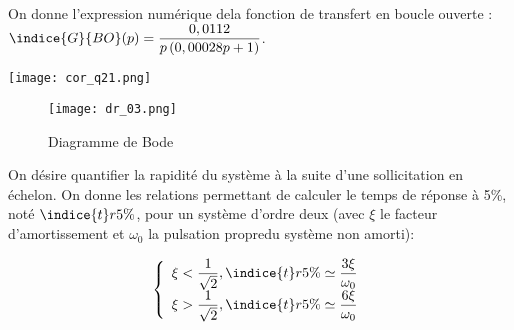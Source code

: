   On donne l’expression numérique dela fonction de transfert en boucle ouverte :
  $\indice{G}{BO}(p)=\dfrac{0,0112}{p\left( 0,00028 p +1\right)}$.

\ifprof
\begin{corrige}%
\begin{center}
\texttt{[image: cor\_q21.png]}
\end{center}
\end{corrige}
\else
\fi

\ifprof
\else

\begin{figure}[!h]
\centering
\texttt{[image: dr\_03.png]}
\caption{Diagramme de Bode \label{dr_03}}
\end{figure}

 On désire quantifier la rapidité du système à la suite d’une sollicitation en échelon. On donne les 
relations permettant de calculer le temps de réponse à 5\%, noté $\indice{t}{r5\%}$, pour un système d’ordre deux (avec $\xi$ le facteur d’amortissement et $\omega_0$ la pulsation propredu système non amorti):

$$
\left\{ 
\begin{array}{l}
\xi < \dfrac{1}{\sqrt{2}}, \indice{t}{r5\%} \simeq \dfrac{3\xi}{ \omega_0} \\
\xi > \dfrac{1}{\sqrt{2}}, \indice{t}{r5\%} \simeq \dfrac{6\xi }{\omega_0} \\
\end{array}
\right.
$$ 
\fi


